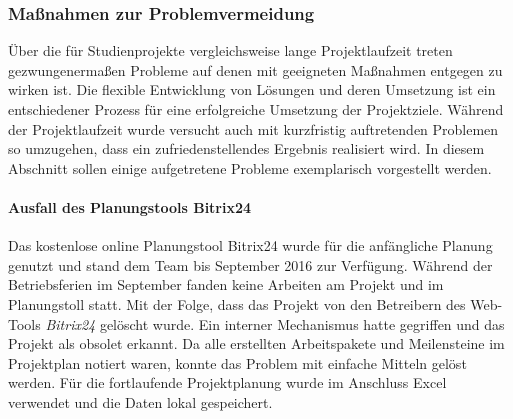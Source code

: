 \subsubsection{Maßnahmen zur Problemvermeidung}
Über die für Studienprojekte vergleichsweise lange Projektlaufzeit treten gezwungenermaßen Probleme auf denen mit geeigneten Maßnahmen entgegen zu wirken ist. Die flexible Entwicklung von Lösungen und deren Umsetzung ist ein entschiedener Prozess für eine erfolgreiche Umsetzung der Projektziele. Während der Projektlaufzeit wurde versucht auch mit kurzfristig auftretenden Problemen so umzugehen, dass ein zufriedenstellendes Ergebnis realisiert wird. In diesem Abschnitt sollen einige aufgetretene Probleme exemplarisch vorgestellt werden.

\paragraph{Ausfall des Planungstools Bitrix24} Das kostenlose online Planungstool Bitrix24 wurde für die anfängliche Planung genutzt und stand dem Team bis September 2016 zur Verfügung. Während der Betriebsferien im September fanden keine Arbeiten am Projekt und im Planungstoll statt. Mit der Folge, dass das Projekt von den Betreibern des Web-Tools \textit{Bitrix24} gelöscht wurde. Ein interner Mechanismus hatte gegriffen und das Projekt als obsolet erkannt. Da alle erstellten Arbeitspakete und Meilensteine im Projektplan notiert waren, konnte das Problem mit einfache Mitteln gelöst werden. Für die fortlaufende Projektplanung wurde im Anschluss Excel verwendet und die Daten lokal gespeichert.

